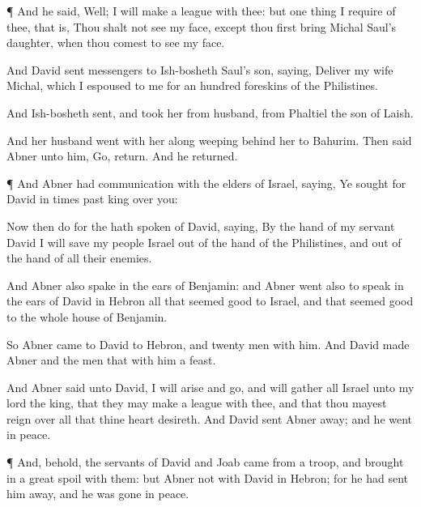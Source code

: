 {\par }{\PP {}¶ And he
said,
Well; I will
make a
league with thee: but
one
thing I
require of thee, that
is, Thou shalt not
see my
face, except thou
first
bring
Michal
Saul’s
daughter, when thou
comest to
see my
face.

And
David
sent
messengers to
Ish-bosheth
Saul’s
son,
saying,
Deliver
{} my
wife
Michal, which I
espoused to me for an
hundred
foreskins of the
Philistines.

And
Ish-bosheth
sent, and
took her from
{}
husband,
{} from
Phaltiel the
son of
Laish.

And her
husband
went with her along
weeping
behind her to
Bahurim. Then
said
Abner unto him,
Go,
return. And he
returned.


\par }{\PP {}¶ And
Abner had
communication with the
elders of
Israel,
saying, Ye
sought for
David in
times
past
{}
king over you:

Now then
do
{} for the
{} hath
spoken of
David,
saying, By the
hand of my
servant
David I will
save my
people
Israel out of the
hand of the
Philistines, and out of the
hand of all their
enemies.

And
Abner also
spake in the
ears of
Benjamin: and
Abner
went also to
speak in the
ears of
David in
Hebron all that
seemed
good to
Israel, and that seemed
good to the whole
house of
Benjamin.

So
Abner
came to
David to
Hebron, and
twenty
men with him. And
David
made
Abner and the
men that
{} with him a
feast.

And
Abner
said unto
David, I will
arise and
go, and will
gather all
Israel unto my
lord the
king, that they may
make a
league with thee, and that thou mayest
reign over all that thine
heart
desireth. And
David
sent
Abner
away; and he
went in
peace.


\par }{\PP {}¶ And, behold, the
servants of
David and
Joab
came from
{} a
troop, and brought
in a
great
spoil with them: but
Abner
{} not with
David in
Hebron; for he had sent him
away, and he was
gone in
peace.

}
